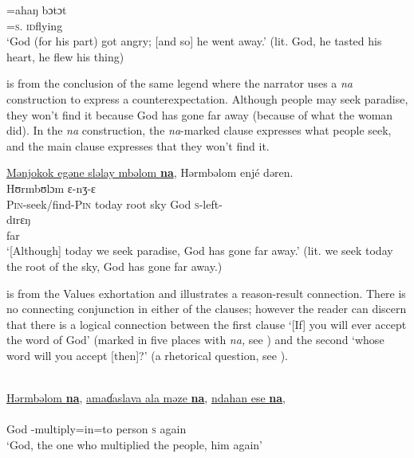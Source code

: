       \medskip
\gll =ahaŋ bɔtɔt\\      
     =\textsc{s}.{\POSS}  \textsc{id}flying\\ 
\glt  ‘God (for his part) got angry; [and so] he went away.’ (lit. God, he tasted his heart, he flew his thing)
\z

 is from the conclusion of the same legend where the narrator uses a \textit{na} construction to express a counterexpectation. Although people may seek paradise, they won’t find it because God has gone far away (because of what the woman did). In the \textit{na} construction, the \textit{na}{}-marked clause expresses what people seek, and the main clause expresses that they won’t find it.

\clearpage
\ea \label{ex:11:18}
\underline{Mənjokok  egəne  sləlay  mbəlom  \textbf{na}},  Hərmbəlom  enjé  dəren.\\
\gll  {}            Hʊrmbʊlɔm ɛ-nʒ-ɛ\\ 
      \textsc{Pin}{}-seek/find-\textsc{Pin}  today  root  sky    {\PSP}  God  \textsc{s}-left-{\CL}\\  
      
      \medskip
\gll dɪrɛŋ\\      
     far\\ 
\glt  ‘[Although] today we seek paradise, God has gone far away.’ (lit. we seek today the root of the sky, God has gone far away.)
\z

 is from the Values exhortation and illustrates a reason-result connection. There is no connecting conjunction in either of the clauses; however the reader can discern that there is a logical connection between the first clause ‘[If] you will ever accept the word of God' (marked in five places with \textit{na,} see ) and the second ‘whose word will you accept [then]?' (a rhetorical question, see ).


\ea \label{ex:11:19}\\
\underline{Hərmbəlom  \textbf{na}},  \underline{amaɗaslava  ala  məze  \textbf{na}},  \underline{ndahan  ese  \textbf{na}},\\    
\gll  {}             \\ 
      God  {\PSP} {\DEP}-multiply=in=to   person {\PSP} \textsc{s}     again    {\PSP}\\    
\glt ‘God, the one who multiplied the people, him again’ \\
      
